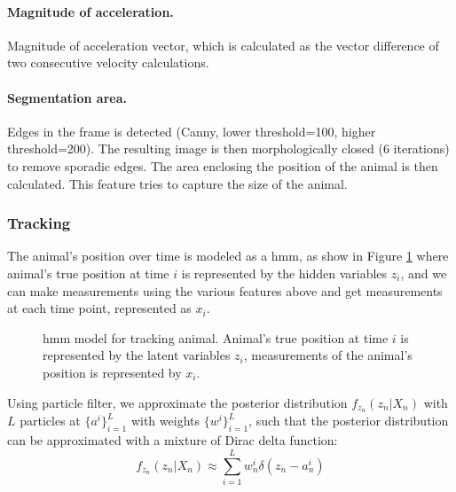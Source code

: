 \paragraph{Magnitude of acceleration.} Magnitude of acceleration vector, which is calculated as the vector difference of two consecutive velocity calculations. 

\paragraph{Segmentation area.} Edges in the frame is detected (Canny, lower threshold=100, higher threshold=200). The resulting image is then morphologically closed (6 iterations) to remove sporadic edges. The area enclosing the position of the animal is then calculated. This feature tries to capture the size of the animal.

\subsubsection{Tracking}

The animal's position over time is modeled as a \gls{hmm}, as show in Figure \ref{f.ad.hmm} where animal's true position at time $i$ is represented by the hidden variables $z_i$, and we can make measurements using the various features above and get measurements at each time point, represented as $x_i$. 

\begin{figure}[h]
    
    \caption{\gls{hmm} model for tracking animal. Animal's true position at time $i$ is represented by the latent variables $z_i$, measurements of the animal's position is represented by $x_i$. \label{f.ad.hmm}}
\end{figure}

Using particle filter, we approximate the posterior distribution $f_{z_n}(z_n|X_n)$ with $L$ particles at $\{a^i\}_{i=1}^L$ with weights $\{w^i\}_{i=1}^L$, such that the posterior distribution can be approximated with a mixture of Dirac delta function: 
\begin{equation} \label{zn_approx}
    f_{z_n}(z_n|X_n) \approx \sum_{i=1}^Lw_n^i\delta(z_n - a_n^i)
\end{equation}

